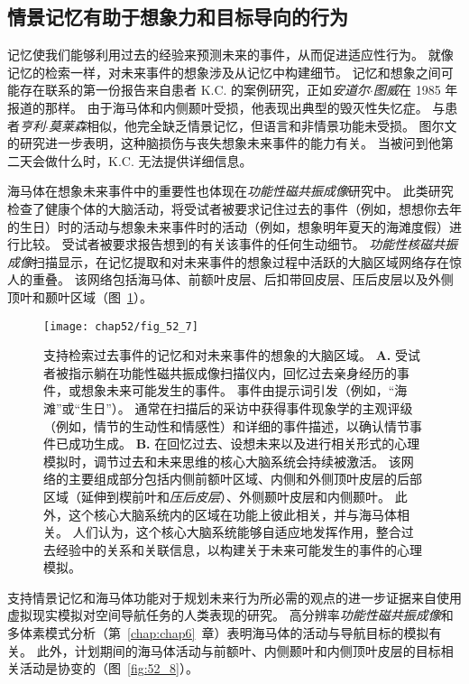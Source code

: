 \subsection{情景记忆有助于想象力和目标导向的行为}

记忆使我们能够利用过去的经验来预测未来的事件，从而促进适应性行为。
就像记忆的检索一样，对未来事件的想象涉及从记忆中构建细节。
记忆和想象之间可能存在联系的第一份报告来自患者 K.C. 的案例研究，正如\textit{安道尔$\cdot$图威}在 1985 年报道的那样。
由于海马体和内侧颞叶受损，他表现出典型的毁灭性失忆症。
与患者\textit{亨利$\cdot$莫莱森}相似，他完全缺乏情景记忆，但语言和非情景功能未受损。
图尔文的研究进一步表明，这种脑损伤与丧失想象未来事件的能力有关。
当被问到他第二天会做什么时，K.C. 无法提供详细信息。


海马体在想象未来事件中的重要性也体现在\textit{功能性磁共振成像}研究中。
此类研究检查了健康个体的大脑活动，将受试者被要求记住过去的事件（例如，想想你去年的生日）时的活动与想象未来事件时的活动（例如，想象明年夏天的海滩度假）进行比较。
受试者被要求报告想到的有关该事件的任何生动细节。
\textit{功能性核磁共振成像}扫描显示，在记忆提取和对未来事件的想象过程中活跃的大脑区域网络存在惊人的重叠。
该网络包括海马体、前额叶皮层、后扣带回皮层、压后皮层以及外侧顶叶和颞叶区域（图~\ref{fig:52_7}）。


\begin{figure}[htbp]
	\centering
	\texttt{[image: chap52/fig\_52\_7]}
	\caption{支持检索过去事件的记忆和对未来事件的想象的大脑区域\cite{schacter2017episodic}。
		\textbf{A.} 受试者被指示躺在功能性磁共振成像扫描仪内，回忆过去亲身经历的事件，或想象未来可能发生的事件。
		事件由提示词引发（例如，“海滩”或“生日”）。
		通常在扫描后的采访中获得事件现象学的主观评级（例如，情节的生动性和情感性）和详细的事件描述，以确认情节事件已成功生成。
		\textbf{B.} 在回忆过去、设想未来以及进行相关形式的心理模拟时，调节过去和未来思维的核心大脑系统会持续被激活。
		该网络的主要组成部分包括内侧前额叶区域、内侧和外侧顶叶皮层的后部区域（延伸到楔前叶和\textit{压后皮层}）、外侧颞叶皮层和内侧颞叶。
		此外，这个核心大脑系统内的区域在功能上彼此相关，并与海马体相关。
		人们认为，这个核心大脑系统能够自适应地发挥作用，整合过去经验中的关系和关联信息，以构建关于未来可能发生的事件的心理模拟。}
	\label{fig:52_7}
\end{figure}


支持情景记忆和海马体功能对于规划未来行为所必需的观点的进一步证据来自使用虚拟现实模拟对空间导航任务的人类表现的研究。
高分辨率\textit{功能性磁共振成像}和多体素模式分析（第~\ref{chap:chap6}~章）表明海马体的活动与导航目标的模拟有关。
此外，计划期间的海马体活动与前额叶、内侧颞叶和内侧顶叶皮层的目标相关活动是协变的（图~\ref{fig:52_8}）。


